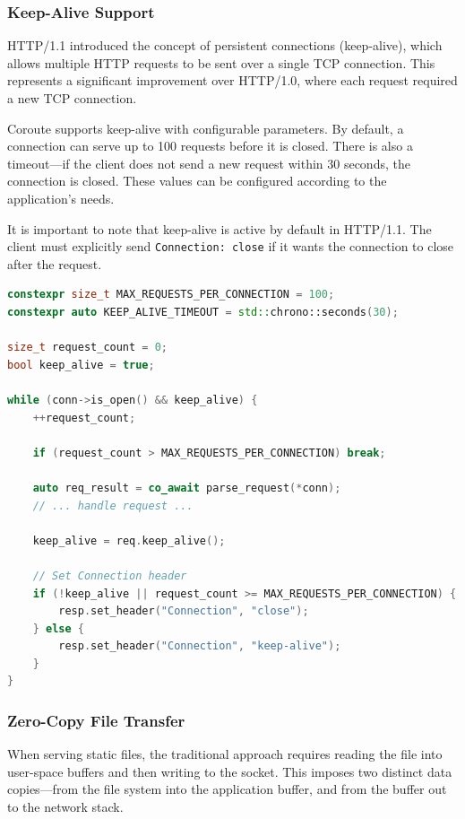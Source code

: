 \subsubsection{Keep-Alive Support}

HTTP/1.1 introduced the concept of persistent connections (keep-alive), which allows multiple HTTP requests to be sent over a single TCP connection. This represents a significant improvement over HTTP/1.0, where each request required a new TCP connection.

Coroute supports keep-alive with configurable parameters. By default, a connection can serve up to 100 requests before it is closed. There is also a timeout---if the client does not send a new request within 30 seconds, the connection is closed. These values can be configured according to the application's needs.

It is important to note that keep-alive is active by default in HTTP/1.1. The client must explicitly send \texttt{Connection: close} if it wants the connection to close after the request.

\begin{lstlisting}[language=C++, basicstyle=\small\ttfamily, caption={Keep-alive loop}]
constexpr size_t MAX_REQUESTS_PER_CONNECTION = 100;
constexpr auto KEEP_ALIVE_TIMEOUT = std::chrono::seconds(30);

size_t request_count = 0;
bool keep_alive = true;

while (conn->is_open() && keep_alive) {
    ++request_count;
    
    if (request_count > MAX_REQUESTS_PER_CONNECTION) break;
    
    auto req_result = co_await parse_request(*conn);
    // ... handle request ...
    
    keep_alive = req.keep_alive();
    
    // Set Connection header
    if (!keep_alive || request_count >= MAX_REQUESTS_PER_CONNECTION) {
        resp.set_header("Connection", "close");
    } else {
        resp.set_header("Connection", "keep-alive");
    }
}
\end{lstlisting}

\subsubsection{Zero-Copy File Transfer}

When serving static files, the traditional approach requires reading the file into user-space buffers and then writing to the socket. This imposes two distinct data copies---from the file system into the application buffer, and from the buffer out to the network stack.

